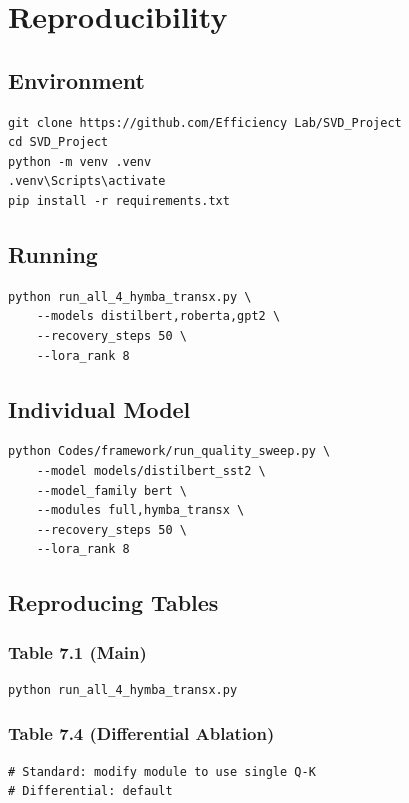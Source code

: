\section{Reproducibility}

\subsection{Environment}

\begin{lstlisting}
git clone https://github.com/Efficiency Lab/SVD_Project
cd SVD_Project
python -m venv .venv
.venv\Scripts\activate
pip install -r requirements.txt
\end{lstlisting}

\subsection{Running}

\begin{lstlisting}
python run_all_4_hymba_transx.py \
    --models distilbert,roberta,gpt2 \
    --recovery_steps 50 \
    --lora_rank 8
\end{lstlisting}

\subsection{Individual Model}

\begin{lstlisting}
python Codes/framework/run_quality_sweep.py \
    --model models/distilbert_sst2 \
    --model_family bert \
    --modules full,hymba_transx \
    --recovery_steps 50 \
    --lora_rank 8
\end{lstlisting}

\subsection{Reproducing Tables}

\subsubsection{Table 7.1 (Main)}
\begin{lstlisting}
python run_all_4_hymba_transx.py
\end{lstlisting}

\subsubsection{Table 7.4 (Differential Ablation)}
\begin{lstlisting}
# Standard: modify module to use single Q-K
# Differential: default
\end{lstlisting}

